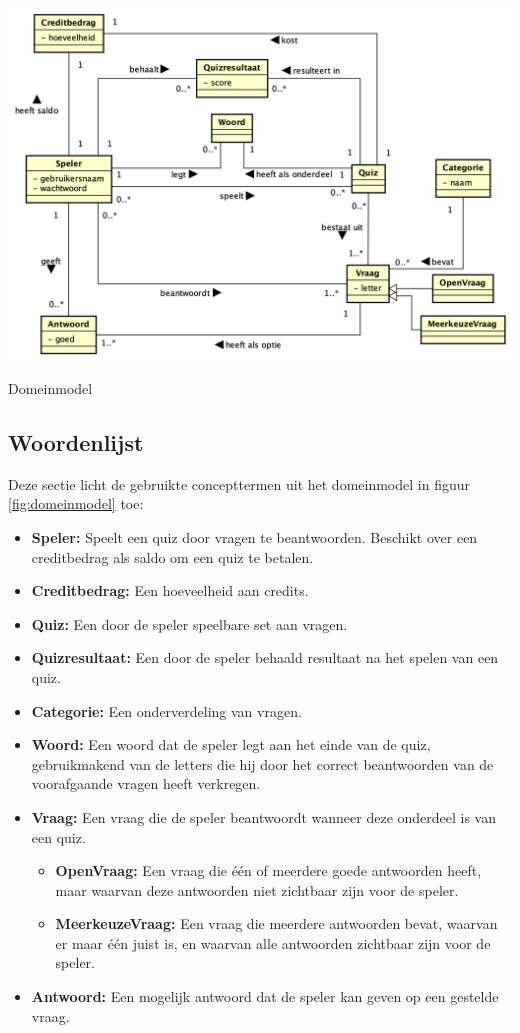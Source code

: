 \begin{mpfigure}
   \centering
   \includegraphics[width=\linewidth]{../Afbeeldingen/Domeinmodel.png}
   \caption{Domeinmodel}\label{fig:domeinmodel}
\end{mpfigure}

\subsection{Woordenlijst}
Deze sectie licht de gebruikte concepttermen uit het domeinmodel in figuur \ref{fig:domeinmodel} toe:
\begin{itemize}
   \item \textbf{Speler:} Speelt een quiz door vragen te beantwoorden. Beschikt over een creditbedrag als saldo om een quiz te betalen.
   \item \textbf{Creditbedrag:} Een hoeveelheid aan credits.
   \item \textbf{Quiz:} Een door de speler speelbare set aan vragen.
   \item \textbf{Quizresultaat:} Een door de speler behaald resultaat na het spelen van een quiz.
   \item \textbf{Categorie:} Een onderverdeling van vragen.
   \item \textbf{Woord:} Een woord dat de speler legt aan het einde van de quiz, gebruikmakend van de letters die hij door het correct beantwoorden van de voorafgaande vragen heeft verkregen.
   \item \textbf{Vraag:} Een vraag die de speler beantwoordt wanneer deze onderdeel is van een quiz.
         \begin{itemize}
            \item \textbf{OpenVraag:} Een vraag die één of meerdere goede antwoorden heeft, maar waarvan deze antwoorden niet zichtbaar zijn voor de speler.
            \item \textbf{MeerkeuzeVraag:} Een vraag die meerdere antwoorden bevat, waarvan er maar één juist is, en waarvan alle antwoorden zichtbaar zijn voor de speler.
         \end{itemize}
   \item \textbf{Antwoord:} Een mogelijk antwoord dat de speler kan geven op een gestelde vraag.
\end{itemize}

